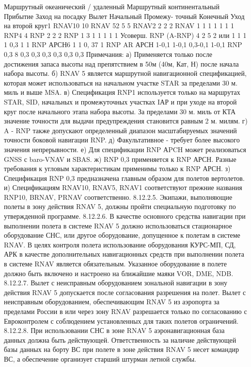Маршрутный океанический
/ удаленный	
Маршрутный
континентальный	
Прибытие	Заход на посадку	Вылет
				Начальный	
Промежу- точный	
Конечный	Уход на второй круг1	
RNAV10	10							
RNAV 52		5	5					
RNAV2		2	2					2
RNAV 1		1	1	1	1		1	1
RNP4	4							
RNP 2	2	2						
RNP 1 3			1	1	1		1	1
Усоверш.
RNP (A-RNP) 4	2 5	2 или 1	1	1	1	0,3	1	1
RNP АРСН6				1	1	0, 37	1	
RNP AR АРСН				1-0,1	1-0,1	0,3-0,1	1-0,1	
RNP 0,3 8		0,3	0,3	0,3	0,3		0,3	0,3
Примечания: 
а)	Применяется только после достижения запаса высоты над препятствием в 50м (40м, Кат, Н) после начала набора высоты. 
б)	RNAV 5 является маршрутной навигационной спецификацией, которая может использоваться на начальном участке STAR за пределами 30 м. миль и выше MSA. 
в)	Спецификация RNP1 используется только на маршрутах STAR, SID, начальных и промежуточных участках IАР и при уходе на второй круг после начального этапа набора высоты. За пределами 30 м. миль от КТА значение точности для выдачи предупреждения становится равным 2 м. милям. 
г)	A - RNP также допускают определенный диапазон масштабируемых значений точности боковой навигации RNP. 
д)	Факультативное - требует более высокого значения непрерывности. 
е)	Для спецификации RNP АPCH может реализоваться GNSS с baro-VNAV и SBAS. 
ж)	RNP 0,3 применяется к RNP АРСН. Разные требования к угловым характеристикам применимы только к RNP АРСН. 
з)	Спецификация RNP 0,3 предназначена главным образом для полетов вертолетов. 
и)	Спецификациям RNAV10, RNAV5, RNAV1 соответствуют прежние названия RNP10, BRNAV, PRNAV соответственно.
8.12.2.5. Экипажи, выполняющие полеты в зону действия RNAV 5, должны пройти специальную подготовку по утвержденной программе.
8.12.2.6. В качестве основного средства навигации при выполнении полета в системе RNAV 5 должно использоваться стационарное оборудование СНС, или другое оборудование, допущенное к полетам в системе RNAV. В целях контроля полета использование оборудования КУРС-МП, СД, АРК в качестве дополнительных навигационных средств при выполнении полета в системе RNAV является обязательным. Указанное оборудование в полете должно быть включено и настроено на ближайшие маяки VOR, DME, NDB. 
8.12.2.7. Вылет с неисправным оборудованием зональной навигации в зону действия RNAV 5 допускается после согласования разрешения на полет.
Вылет с неисправным оборудованием, обеспечивающим RNAV 5 из аэропорта за пределами России в или через зону RNAV разрешается только по согласованию с Евроконтролем с соблюдением установленных для таких полетов ограничений.
8.12.2.8. При использовании СНС в зоне RNAV 5 аэронавигационная база данных должна быть действующей. Ответственность за наличие действующей базы данных на борту ВС при полете в зоне действия RNAV 5 несет командир ВС, а обеспечение организует старший штурман летной службы.
